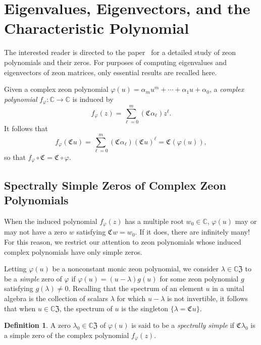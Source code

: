 \documentclass{article}
\theoremstyle{definition}
\newtheorem{definition}[theorem]{Definition}
\newcommand{\zco}{\mathfrak{C}\mspace{1mu}}
\newcommand{\CZ}{\mathbb{C}\mathfrak{Z}}
\numberwithin{equation}{section}
\begin{document}
\section{Eigenvalues, Eigenvectors, and the Characteristic Polynomial}\label{zeon eigenvalues}

The interested reader is directed to the paper~\cite{simplezeonzeros} for a detailed study of zeon polynomials and their zeros.  For purposes of computing eigenvalues and eigenvectors of zeon matrices, only essential results are recalled here.

Given a complex zeon polynomial $\varphi(u)=\alpha_m u^m+\cdots+\alpha_1 u+\alpha_0$, a {\em complex polynomial} $f_\varphi:\mathbb{C}\to\mathbb{C}$ is induced by \begin{equation*}
f_\varphi(z)=\sum_{\ell=0}^m (\zco \alpha_\ell) z^\ell.
\end{equation*}
It follows that \begin{equation*}
f_\varphi(\zco u)=\sum_{\ell=0}^m (\zco \alpha_\ell) (\zco u)^\ell=\zco(\varphi(u)),\end{equation*}
so that $f_\varphi\circ\zco=\zco\circ \varphi$.  


\subsection{Spectrally Simple Zeros of Complex Zeon Polynomials}

When the induced polynomial $f_\varphi(z)$ has a multiple root $w_0\in\mathbb{C}$, $\varphi(u)$ may or may not have a zero $w$ satisfying $\zco w=w_0$.  If it does, there are infinitely many!  For this reason, we restrict our attention to zeon polynomials whose induced complex polynomials have only simple zeros.

Letting $\varphi(u)$ be a nonconstant monic zeon polynomial, we consider $\lambda\in{\CZ}$ to be a {\em simple} zero of $\varphi$ if $\varphi(u)=(u-\lambda)g(u)$ for some zeon polynomial $g$ satisfying $g(\lambda)\ne 0$.  Recalling that the spectrum of an element $u$ in a unital algebra is the collection of scalars $\lambda$ for which $u-\lambda$ is not invertible, it follows that when $u\in\CZ$, the spectrum of $u$ is the singleton $\{\lambda=\zco u\}$.   

\begin{definition}
A zero $\lambda_0\in{\CZ}$ of $\varphi(u)$ is said to be a {\em spectrally simple} if $\zco \lambda_0$ is a simple zero of the complex polynomial $f_\varphi(z)$.
\end{definition}  
\end{document}

